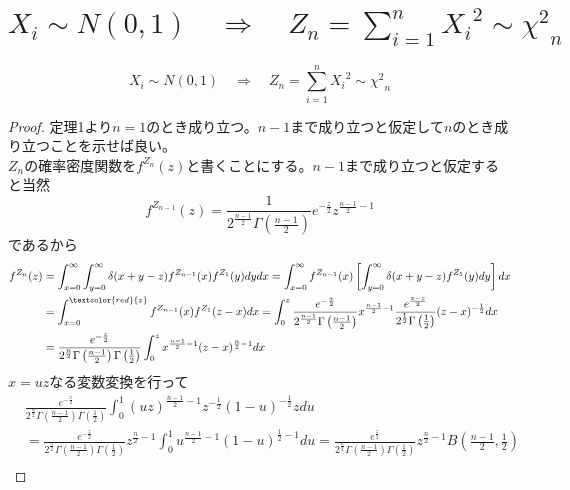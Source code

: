     \section{\texorpdfstring{$X_i \sim N(0,1) \quad \Rightarrow \quad Z_n = \sum_{i=1}^{n}{{X_i}^2} \sim {\chi^2}_n$}{Xi～N(0,1) ⇒ Zn = (X1)\string^2 + ... + (Xn)\string^2 ～ χ\string^2\_n}}
        \label{標準正規分布に従うn個の独立な確率変数の2乗和は自由度n-1のカイ2乗分布に従う}
        \begin{shadebox}
            \[X_i \sim N(0,1) \quad \Rightarrow \quad Z_n = \sum_{i=1}^{n}{{X_i}^2} \sim {\chi^2}_n\]
        \end{shadebox}
        \begin{proof}
            \quad\par
            定理1より$n=1$のとき成り立つ。$n-1$まで成り立つと仮定して$n$のとき成り立つことを示せば良い。\\
            $Z_n$の確率密度関数を$f^{Z_n}(z)$と書くことにする。$n-1$まで成り立つと仮定すると当然
            \[f^{Z_{n-1}}(z) = \frac{1}{2^{\frac{n-1}{2}}\Gamma\left(\frac{n-1}{2}\right)}e^{-\frac{z}{2}}z^{\frac{n-1}{2}-1}\]
            であるから
            \begin{align*}
                f^{Z_n}(z) &= \int_{x=0}^{\infty}{\int_{y=0}^{\infty}{\delta(x+y-z)f^{Z_{n-1}}(x)f^{Z_1}(y) dy} dx} = \int_{x=0}^{\infty}{f^{Z_{n-1}}(x)\left[\int_{y=0}^{\infty}{\delta(x+y-z)f^{Z_1}(y) dy}\right] dx}\\
                &= \int_{x=0}^{\textcolor{red}{z}}{f^{Z_{n-1}}(x)f^{Z_1}(z-x) dx} = \int_{0}^{z}{\frac{e^{-\frac{x}{2}}}{2^{\frac{n-1}{2}}\Gamma\left(\frac{n-1}{2}\right)}x^{\frac{n-1}{2}-1}\frac{e^{\frac{x-z}{2}}}{2^{\frac{1}{2}}\Gamma\left(\frac{1}{2}\right)}(z-x)^{-\frac{1}{2}} dx}\\
                &= \frac{e^{-\frac{z}{2}}}{2^{\frac{n}{2}}\Gamma\left(\frac{n-1}{2}\right)\Gamma\left(\frac{1}{2}\right)}\int_{0}^{z}{x^{\frac{n-1}{2}-1}(z-x)^{\frac{n}{2}-1} dx}
            \end{align*}
            $x=uz$なる変数変換を行って
            \begin{align*}
                &\frac{e^{-\frac{z}{2}}}{2^{\frac{n}{2}}\Gamma\left(\frac{n-1}{2}\right)\Gamma\left(\frac{1}{2}\right)}\int_{0}^{1}{(uz)^{\frac{n-1}{2}-1}z^{-\frac{1}{2}}(1-u)^{-\frac{1}{2}} zdu}\\
                &= \frac{e^{-\frac{z}{2}}}{2^{\frac{n}{2}}\Gamma\left(\frac{n-1}{2}\right)\Gamma\left(\frac{1}{2}\right)}z^{\frac{n}{2}-1}\int_{0}^{1}{u^{\frac{n-1}{2}-1}(1-u)^{\frac{1}{2}-1} du} = \frac{e^{\frac{z}{2}}}{2^{\frac{n}{2}}\Gamma\left(\frac{n-1}{2}\right)\Gamma\left(\frac{1}{2}\right)}z^{\frac{n}{2}-1}B\left(\frac{n-1}{2},\frac{1}{2}\right)\\

\end{align*}
\end{proof}

